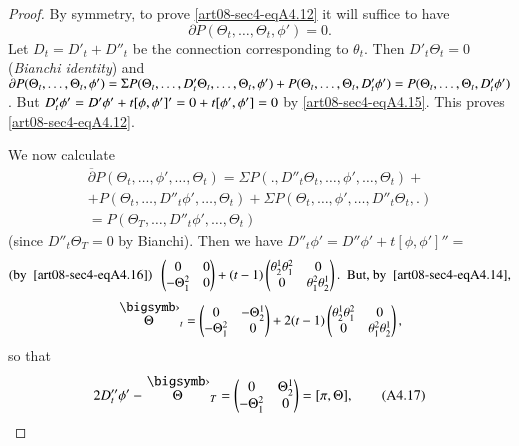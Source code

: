 \begin{proof}
By symmetry, to prove \eqref{art08-sec4-eqA4.12} it will suffice to have 
$$
\partial P(\Theta_{t},\ldots,\Theta_{t},\phi')=0.
$$ 
Let $D_{t}=D'_{t}+D''_{t}$ be the connection corresponding to $\theta_{t}$. Then $D'_{t}\Theta_{t}=0$ (\textit{Bianchi identity}) and $\partial P(\Theta_{t},\ldots,\Theta_{t},\phi')=\Sigma P(\Theta_{t},\ldots,D'_{t}\Theta_{t},\ldots,\Theta_{t},\phi')\break +P(\Theta_{t},\ldots,\Theta_{t},D'_{t}\phi')=P(\Theta_{t},\ldots,\Theta_{t},D'_{t}\phi')$. But $D'_{t}\phi'=D'\phi'+t[\phi,\phi']'\break =0+t[\phi',\phi']=0$ by \eqref{art08-sec4-eqA4.15}. This proves \eqref{art08-sec4-eqA4.12}.

We now calculate 
\begin{gather*}
\overline{\partial}P(\Theta_{t},\ldots,\phi',\ldots,\Theta_{t})=\Sigma P(.,D''_{t}\Theta_{t},\ldots,\phi',\ldots,\Theta_{t})+\\
 +P(\Theta_{t},\ldots,D''_{t}\phi',\ldots,\Theta_{t})+\Sigma P(\Theta_{t},\ldots,\phi',\ldots,D''_{t}\Theta_{t},.)\\
=P(\Theta_{T},\ldots,D''_{t}\phi',\ldots,\Theta_{t})
 \end{gather*}
(since $D''_{t}\Theta_{T}=0$ by Bianchi). Then we have $D''_{t}\phi'=D''\phi'+t[\phi,\phi']''=$
\begin{gather*}
(\text{by~ \eqref{art08-sec4-eqA4.16}}) \ \ \left(\begin{matrix} 0 & 0 \\ -\Theta^{2}_{1} & 0\end{matrix}\right)+(t-1)\left(\begin{matrix} \theta^{1}_{2} \theta^{2}_{1} & 0 \\ 0 & \theta^{2}_{1}\theta^{1}_{2}\end{matrix}\right). \ \ \text{But, by~ \eqref{art08-sec4-eqA4.14},}\\[3pt]
\overdot{\Theta}_{t}=\left(\begin{matrix} 0 & -\Theta^{1}_{2}\\ - \Theta^{2}_{1} & 0\end{matrix}\right)+2(t-1)\left(\begin{matrix} \theta^{1}_{2}\theta^{2}_{1} & 0\\ 0 & \theta^{2}_{1}\theta^{1}_{2}\end{matrix}\right),
\end{gather*}
so that
\begin{equation*}
2D''_{t}\phi'-\overdot{\Theta}_{T}=\left(\begin{matrix} 0 & \Theta^{1}_{2}\\ -\Theta^{2}_{1} & 0\end{matrix}\right)=[\pi,\Theta],\tag{A4.17}\label{art08-sec4-eqA4.17}

\end{equation*}
\end{proof}
